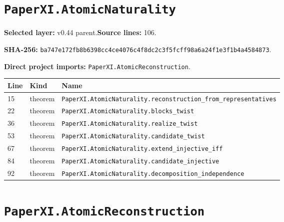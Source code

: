 \documentclass[10pt,oneside]{book}
\begin{document}
\section{\texorpdfstring{\nolinkurl{PaperXI.AtomicNaturality}}{PaperXI.AtomicNaturality}}\label{module:PaperXI.AtomicNaturality}

\textbf{Selected layer:} v0.44 parent.\quad\textbf{Source lines:} 106.\par\textbf{SHA-256:} {\scriptsize\nolinkurl{ba747e172fb8b6398cc4ce4076c4f8dc2c3f5fcff98a6a24f1e3f1b4a4584873}}.


\textbf{Direct project imports:} \nolinkurl{PaperXI.AtomicReconstruction}.

\begin{longtable}{@{}p{}p{}p{}@{}}\toprule Line&Kind&Name\\\midrule\endhead

15&theorem&\nolinkurl{PaperXI.AtomicNaturality.reconstruction_from_representatives}\\

22&theorem&\nolinkurl{PaperXI.AtomicNaturality.blocks_twist}\\

36&theorem&\nolinkurl{PaperXI.AtomicNaturality.realize_twist}\\

53&theorem&\nolinkurl{PaperXI.AtomicNaturality.candidate_twist}\\

67&theorem&\nolinkurl{PaperXI.AtomicNaturality.extend_injective_iff}\\

84&theorem&\nolinkurl{PaperXI.AtomicNaturality.candidate_injective}\\

92&theorem&\nolinkurl{PaperXI.AtomicNaturality.decomposition_independence}\\

\bottomrule\end{longtable}

\section{\texorpdfstring{\nolinkurl{PaperXI.AtomicReconstruction}}{PaperXI.AtomicReconstruction}}\label{module:PaperXI.AtomicReconstruction}
\end{document}
